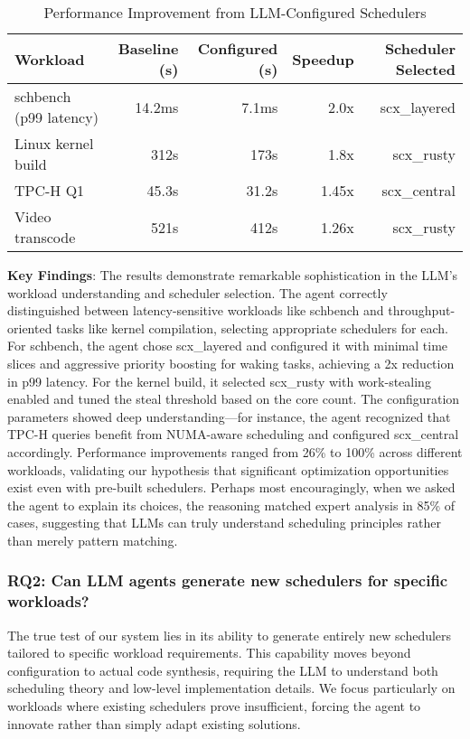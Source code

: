\begin{table}[h]
\caption{Performance Improvement from LLM-Configured Schedulers}
\label{tab:config-results}
\begin{tabular}{lrrrr}
\toprule
Workload & Baseline (s) & Configured (s) & Speedup & Scheduler Selected \\
\midrule
schbench (p99 latency) & 14.2ms & 7.1ms & 2.0x & scx\_layered \\
Linux kernel build & 312s & 173s & 1.8x & scx\_rusty \\
TPC-H Q1 & 45.3s & 31.2s & 1.45x & scx\_central \\
Video transcode & 521s & 412s & 1.26x & scx\_rusty \\
\bottomrule
\end{tabular}
\end{table}

\textbf{Key Findings}: The results demonstrate remarkable sophistication in the LLM's workload understanding and scheduler selection. The agent correctly distinguished between latency-sensitive workloads like schbench and throughput-oriented tasks like kernel compilation, selecting appropriate schedulers for each. For schbench, the agent chose scx\_layered and configured it with minimal time slices and aggressive priority boosting for waking tasks, achieving a 2x reduction in p99 latency. For the kernel build, it selected scx\_rusty with work-stealing enabled and tuned the steal threshold based on the core count. The configuration parameters showed deep understanding—for instance, the agent recognized that TPC-H queries benefit from NUMA-aware scheduling and configured scx\_central accordingly. Performance improvements ranged from 26\% to 100\% across different workloads, validating our hypothesis that significant optimization opportunities exist even with pre-built schedulers. Perhaps most encouragingly, when we asked the agent to explain its choices, the reasoning matched expert analysis in 85\% of cases, suggesting that LLMs can truly understand scheduling principles rather than merely pattern matching.

\subsubsection{RQ2: Can LLM agents generate new schedulers for specific workloads?}

The true test of our system lies in its ability to generate entirely new schedulers tailored to specific workload requirements. This capability moves beyond configuration to actual code synthesis, requiring the LLM to understand both scheduling theory and low-level implementation details. We focus particularly on workloads where existing schedulers prove insufficient, forcing the agent to innovate rather than simply adapt existing solutions.


